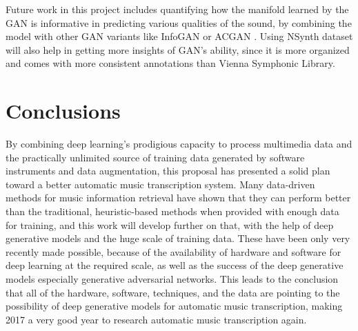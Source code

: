 Future work in this project includes quantifying how the manifold learned by the GAN is informative in predicting various qualities of the sound, by combining the model with other GAN variants like InfoGAN \cite{chen2016infogan} or ACGAN \cite{odena2016acgan}.
Using NSynth dataset will also help in getting more insights of GAN's ability, since it is more organized and comes with more consistent annotations than Vienna Symphonic Library.






\section{Conclusions}\label{sec:conclusions}

By combining deep learning's prodigious capacity to process multimedia data and the practically unlimited source of training data generated by software instruments and data augmentation, this proposal has presented a solid plan toward a better automatic music transcription system.
Many data-driven methods for music information retrieval have shown that they can perform better than the traditional, heuristic-based methods when provided with enough data for training, and this work will develop further on that, with the help of deep generative models and the huge scale of training data.
These have been only very recently made possible, because of the availability of hardware and software for deep learning at the required scale, as well as the success of the deep generative models especially generative adversarial networks.
This leads to the conclusion that all of the hardware, software, techniques, and the data are pointing to the possibility of deep generative models for automatic music transcription, making 2017 a very good year to research automatic music transcription again.

